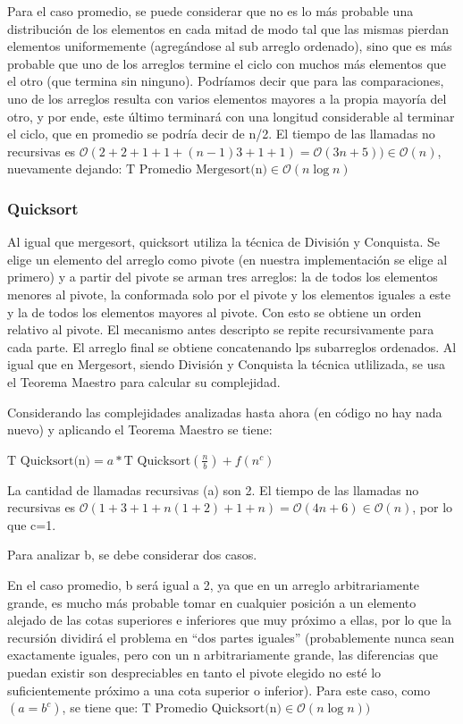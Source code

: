 \documentclass[article,a4paper]{article}
\begin{document}
Para el caso promedio, se puede considerar que no es lo más probable una distribución de los elementos en cada mitad de modo tal que las mismas pierdan elementos uniformemente (agregándose al sub arreglo ordenado), sino que es más probable que uno de los arreglos termine el ciclo con muchos más elementos que el otro (que termina sin ninguno). Podríamos decir que para las comparaciones, uno de los arreglos resulta con varios elementos mayores a la propia mayoría del otro, y por ende, este último terminará con una longitud considerable al terminar el ciclo, que en promedio se podría decir de n/2. El tiempo de las llamadas no recursivas es $\mathcal O(2 + 2 + 1 + 1 + (n-1) 3 + 1 + 1) = \mathcal O(3n + 5)) \in \mathcal O(n)$, nuevamente dejando: $\mbox{T Promedio Mergesort(n)} \in \mathcal O(n \log n)$ 

\subsubsection{Quicksort}

Al igual que mergesort, quicksort utiliza la técnica de División y Conquista. Se elige un elemento del arreglo como pivote (en nuestra implementación se elige al primero) y a partir del pivote se arman tres arreglos: la de todos los elementos menores al pivote, la conformada solo por el pivote y los elementos iguales a este y la de todos los elementos mayores al pivote. Con esto se obtiene un orden relativo al pivote. El mecanismo antes descripto se repite recursivamente para cada parte. El arreglo final se obtiene concatenando lps subarreglos ordenados. Al igual que en Mergesort, siendo División y Conquista la técnica utlilizada, se usa el Teorema Maestro para calcular su complejidad.

Considerando las complejidades analizadas hasta ahora (en código no hay nada nuevo) y aplicando el Teorema Maestro se tiene:

$\mbox{T Quicksort(n)} = a * \mbox{T Quicksort}(\frac{n}{b}) + f(n^c)$

La cantidad de llamadas recursivas (a) son 2. El tiempo de las llamadas no recursivas es $\mathcal O(1 + 3 + 1 + n (1 + 2) + 1 + n) = \mathcal O(4n + 6) \in \mathcal O(n)$, por lo que c=1. 

Para analizar b, se debe considerar dos casos. 

En el caso promedio, b será igual a 2, ya que en un arreglo arbitrariamente grande, es mucho más probable tomar en cualquier posición a un elemento alejado de las cotas superiores e inferiores que muy próximo a ellas, por lo que la recursión dividirá el problema en “dos partes iguales” (probablemente nunca sean exactamente iguales, pero con un n arbitrariamente grande, las diferencias que puedan existir son despreciables en tanto el pivote elegido no esté lo suficientemente próximo a una cota superior o inferior). Para este caso, como $(a = b^c)$, se tiene que: $\mbox{T Promedio Quicksort(n)} \in \mathcal O(n \log n))$
\end{document}
